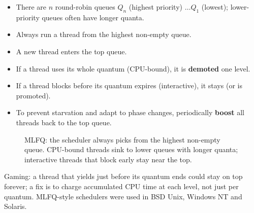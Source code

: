 \begin{itemize}
  \item There are $n$ round-robin queues $Q_n$ (highest priority) $\dots Q_1$ (lowest);
    lower-priority queues often have longer quanta.
  \item Always run a thread from the highest non-empty queue.
  \item A new thread enters the top queue.
  \item If a thread uses its whole quantum (CPU-bound), it is \textbf{demoted} one level.
  \item If a thread blocks before its quantum expires (interactive), it stays (or is promoted).
  \item To prevent starvation and adapt to phase changes, periodically \textbf{boost} all
    threads back to the top queue.
\end{itemize}

\begin{figure}[H]
\centering
{}
\caption{MLFQ: the scheduler always picks from the highest non-empty queue.
CPU-bound threads sink to lower queues with longer quanta; interactive
threads that block early stay near the top.}
\end{figure}
Gaming: a thread that yields just before its quantum ends could stay on top forever; a fix is to
charge accumulated CPU time at each level, not just per quantum. MLFQ-style schedulers were used
in BSD Unix, Windows NT and Solaris.

